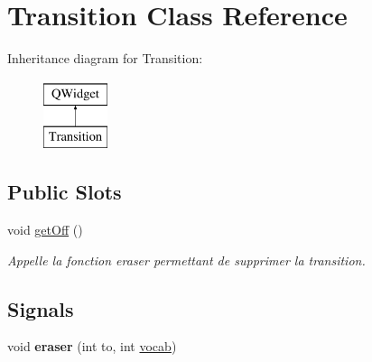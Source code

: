 \hypertarget{class_transition}{\section{Transition Class Reference}
\label{class_transition}
}
Inheritance diagram for Transition\-:\begin{figure}[H]
\begin{center}
\leavevmode
\includegraphics[height=2.000000cm]{class_transition}
\end{center}
\end{figure}
\subsection*{Public Slots}
\begin{DoxyCompactItemize}
\item 
\hypertarget{class_transition_a74d10ea64197661946db6d02b35b4cf1}{void \hyperlink{class_transition_a74d10ea64197661946db6d02b35b4cf1}{get\-Off} ()}\label{class_transition_a74d10ea64197661946db6d02b35b4cf1}

\begin{DoxyCompactList}\small\item\em Appelle la fonction eraser permettant de supprimer la transition. \end{DoxyCompactList}\end{DoxyCompactItemize}
\subsection*{Signals}
\begin{DoxyCompactItemize}
\item 
\hypertarget{class_transition_a926577e13d675e3caaf96660605e11a4}{void {\bfseries eraser} (int to, int \hyperlink{class_transition_a209c68fd432cd8e763342c1f2c784a87}{vocab})}\label{class_transition_a926577e13d675e3caaf96660605e11a4}

\end{DoxyCompactItemize}
